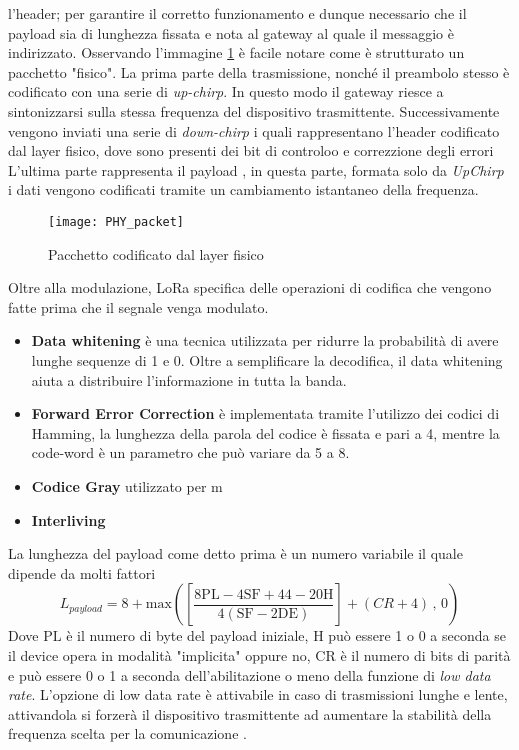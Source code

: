 l'header; per garantire il corretto funzionamento e dunque necessario che il
payload sia di lunghezza fissata e nota al gateway al quale il messaggio è
indirizzato.
Osservando l'immagine \ref{fig:freq_lora_chirp}  è facile notare come è
strutturato un pacchetto "fisico".
La prima parte della trasmissione, nonché il preambolo  stesso è codificato con una
serie di \emph{up-chirp}. In questo modo il gateway riesce a sintonizzarsi sulla
stessa frequenza del dispositivo trasmittente.
Successivamente vengono inviati una serie di
\emph{down-chirp} i quali rappresentano l'header codificato dal layer fisico,
dove sono presenti dei bit di controloo e correzzione degli errori
L'ultima parte rappresenta il payload , in questa parte, formata solo da
\emph{UpChirp} i dati vengono codificati tramite un cambiamento istantaneo della
frequenza.
\begin{figure}[h]
        \centering 
                \texttt{[image: PHY\_packet]}
        \caption{Pacchetto codificato dal layer fisico}
        \label{fig:freq_lora_chirp}
\end{figure}
Oltre alla modulazione, LoRa specifica delle operazioni di codifica che vengono
fatte prima che il segnale venga modulato.
\begin{itemize}
        \item \textbf{Data whitening} è una tecnica utilizzata per ridurre la
        probabilità di avere lunghe sequenze di 1 e 0. Oltre a semplificare la
        decodifica, il data whitening aiuta a distribuire l'informazione in tutta la
        banda.
        \item \textbf{Forward Error Correction} è implementata tramite
        l'utilizzo dei codici di Hamming, la lunghezza della parola del codice è
        fissata e pari a 4, mentre la code-word è un parametro che può variare
        da 5 a 8.
        \item \textbf{Codice Gray} utilizzato per m 
        \item \textbf{Interliving}
\end{itemize}
La lunghezza del payload come detto prima è un numero variabile il quale dipende
da molti fattori 
\begin{equation}
        L_{payload} = 8+
        \text{max}\left(\left[\frac{8\text{PL}-4\text{SF}+44-20\text{H}}{4(\text{SF}-2\text{DE})}
        \right]+(CR+4)\, , \, 0 \right)
\end{equation}
Dove $\text{PL}$ è il numero di byte del payload iniziale, $\text{H}$ può essere
1 o 0 a seconda se il device opera in modalità "implicita" oppure no,
$\text{CR}$ è il numero di bits di parità e  può essere 0 o 1 a seconda
dell'abilitazione o meno della funzione di \emph{low data rate}.
L'opzione di low data rate è attivabile in caso di trasmissioni lunghe e lente,
attivandola si forzerà il dispositivo trasmittente ad aumentare la stabilità
della frequenza scelta per la comunicazione .

